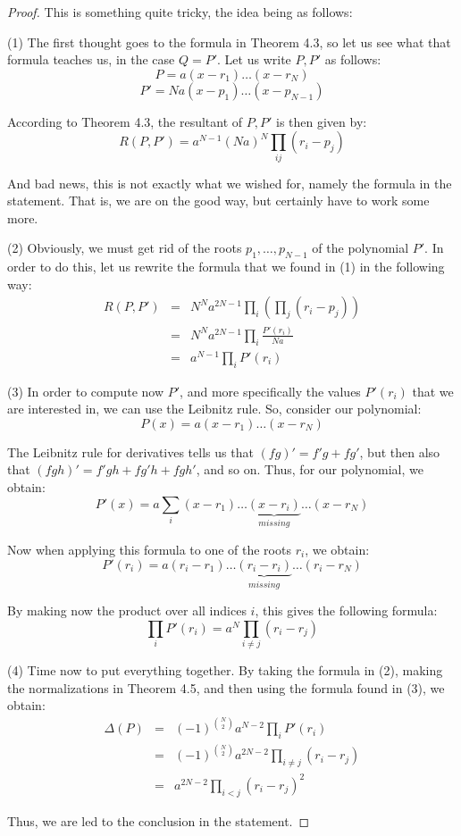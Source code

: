 \documentclass[12pt]{amsbook}
\begin{document}
\begin{proof}
This is something quite tricky, the idea being as follows:

\medskip

(1) The first thought goes to the formula in Theorem 4.3, so let us see what that formula teaches us, in the case $Q=P'$. Let us write $P,P'$ as follows:
$$P=a(x-r_1)\ldots(x-r_N)$$ 
$$P'=Na(x-p_1)\ldots(x-p_{N-1})$$

According to Theorem 4.3, the resultant of $P,P'$ is then given by:
$$R(P,P')=a^{N-1}(Na)^N\prod_{ij}(r_i-p_j)$$

And bad news, this is not exactly what we wished for, namely the formula in the statement. That is, we are on the good way, but certainly have to work some more.

\medskip

(2) Obviously, we must get rid of the roots $p_1,\ldots,p_{N-1}$ of the polynomial $P'$. In order to do this, let us rewrite the formula that we found in (1) in the following way:
\begin{eqnarray*}
R(P,P')
&=&N^Na^{2N-1}\prod_i\left(\prod_j(r_i-p_j)\right)\\
&=&N^Na^{2N-1}\prod_i\frac{P'(r_i)}{Na}\\
&=&a^{N-1}\prod_iP'(r_i)
\end{eqnarray*}

(3) In order to compute now $P'$, and more specifically the values $P'(r_i)$ that we are interested in, we can use the Leibnitz rule. So, consider our polynomial:
$$P(x)=a(x-r_1)\ldots(x-r_N)$$ 

The Leibnitz rule for derivatives tells us that $(fg)'=f'g+fg'$, but then also that $(fgh)'=f'gh+fg'h+fgh'$, and so on. Thus, for our polynomial, we obtain:
$$P'(x)=a\sum_i(x-r_1)\ldots\underbrace{(x-r_i)}_{missing}\ldots(x-r_N)$$ 

Now when applying this formula to one of the roots $r_i$, we obtain:
$$P'(r_i)=a(r_i-r_1)\ldots\underbrace{(r_i-r_i)}_{missing}\ldots(r_i-r_N)$$ 

By making now the product over all indices $i$, this gives the following formula:
$$\prod_iP'(r_i)=a^N\prod_{i\neq j}(r_i-r_j)$$

(4) Time now to put everything together. By taking the formula in (2), making the normalizations in Theorem 4.5, and then using the formula found in (3), we obtain:
\begin{eqnarray*}
\Delta(P)
&=&(-1)^{\binom{N}{2}}a^{N-2}\prod_iP'(r_i)\\
&=&(-1)^{\binom{N}{2}}a^{2N-2}\prod_{i\neq j}(r_i-r_j)\\
&=&a^{2N-2}\prod_{i<j}(r_i-r_j)^2
\end{eqnarray*}

Thus, we are led to the conclusion in the statement.
\end{proof}
\end{document}
